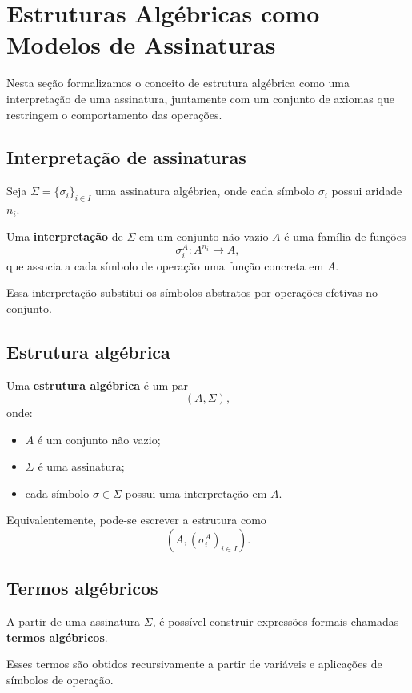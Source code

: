 \documentclass[../../main]{subfiles}
\begin{document}
\section{Estruturas Algébricas como Modelos de Assinaturas}
\label{sec:matematica:algebra:estruturas-algebricas:modelos}

Nesta seção formalizamos o conceito de estrutura algébrica como uma interpretação de uma assinatura, juntamente com um conjunto de axiomas que restringem o comportamento das operações.

\subsection{Interpretação de assinaturas}

Seja $\Sigma = \{\sigma_i\}_{i \in I}$ uma assinatura algébrica, onde cada símbolo $\sigma_i$ possui aridade $n_i$.

Uma \textbf{interpretação} de $\Sigma$ em um conjunto não vazio $A$ é uma família de funções
\[
	\sigma_i^A : A^{n_i} \to A,
\]
que associa a cada símbolo de operação uma função concreta em $A$.

Essa interpretação substitui os símbolos abstratos por operações efetivas no conjunto.

\subsection{Estrutura algébrica}

Uma \textbf{estrutura algébrica} é um par
\[
	(A, \Sigma),
\]
onde:

\begin{itemize}
	\item $A$ é um conjunto não vazio;
	\item $\Sigma$ é uma assinatura;
	\item cada símbolo $\sigma \in \Sigma$ possui uma interpretação em $A$.
\end{itemize}

Equivalentemente, pode-se escrever a estrutura como
\[
	(A, (\sigma_i^A)_{i \in I}).
\]

\subsection{Termos algébricos}

A partir de uma assinatura $\Sigma$, é possível construir expressões formais chamadas \textbf{termos algébricos}.

Esses termos são obtidos recursivamente a partir de variáveis e aplicações de símbolos de operação.
\end{document}
